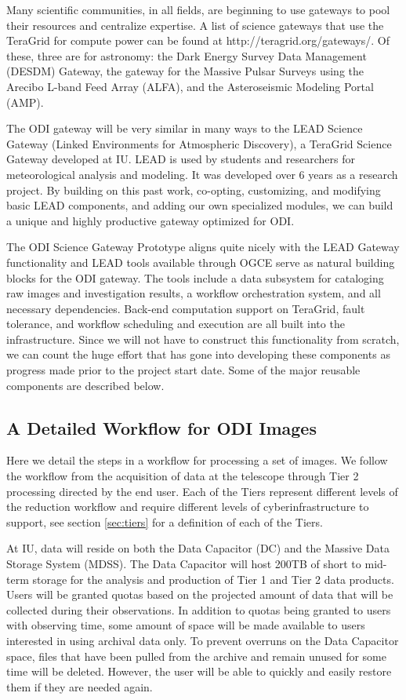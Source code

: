 \documentclass[10pt,conference]{IEEEtran}
\begin{document}
Many scientific communities, in all fields, are beginning to use gateways to pool their resources and centralize expertise.  A list of science gateways that use the TeraGrid for compute power can be found at http://teragrid.org/gateways/. Of these, three are for astronomy: the Dark Energy Survey Data Management (DESDM) Gateway, the gateway for the Massive Pulsar Surveys using the Arecibo L-band Feed Array (ALFA), and the Asteroseismic Modeling Portal (AMP).  

The ODI gateway will be very similar in many ways to the LEAD Science Gateway (Linked Environments for Atmospheric Discovery), a TeraGrid Science Gateway developed at IU. LEAD is used by students and researchers for meteorological analysis and modeling. It was developed over 6 years as a research project. By building on this past work, co-opting, customizing, and modifying basic LEAD components, and adding our own specialized modules, we can build a unique and highly productive gateway optimized for ODI.

The ODI Science Gateway Prototype aligns quite nicely with the LEAD Gateway functionality and LEAD tools available through OGCE serve as natural building blocks for the ODI gateway. The tools include a data subsystem for cataloging raw images and investigation results, a workflow orchestration system, and all necessary dependencies. Back-end computation support on TeraGrid, fault tolerance, and workflow scheduling and execution are all built into the infrastructure. Since we will not have to construct this functionality from scratch, we can count the huge effort that has gone into developing these components as progress made prior to the project start date. Some of the major reusable components are described below.

\subsection{A Detailed Workflow for ODI Images}\label{sec:workflow}

Here we detail the steps in a workflow for processing a set of images. We follow the workflow from the acquisition of data at the telescope through Tier 2 processing directed by the end user. Each of the Tiers represent different levels of the reduction workflow and require different levels of cyberinfrastructure to support, see section \ref{sec:tiers} for a definition of each of the Tiers.

At IU, data will reside on both the Data Capacitor (DC) and the Massive Data Storage System (MDSS).
The Data Capacitor will host 200TB of short to mid-term storage for the analysis and production of Tier 1 and Tier 2 data products. Users will be granted quotas based on the projected amount of data that will be collected during their observations. In addition to quotas being granted to users with observing time, some amount of space will be made available to users interested in using archival data only. To prevent overruns on the Data Capacitor space, files that have been pulled from the archive and remain unused for some time will be deleted. However, the user will be able to quickly and easily restore them if they are needed again.
\end{document}
